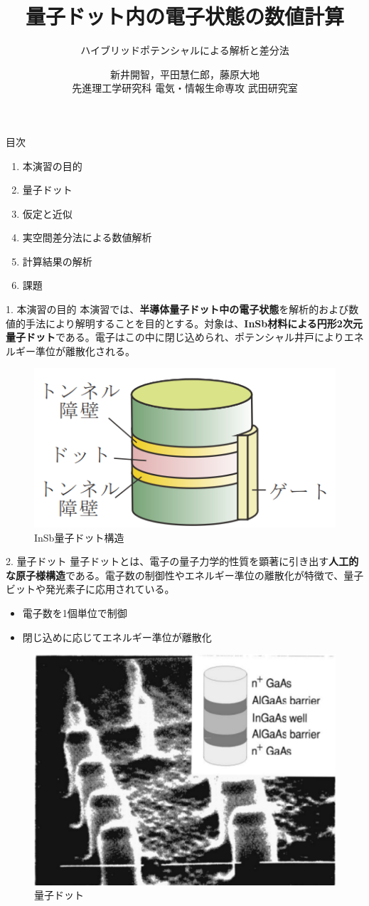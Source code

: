 \documentclass[dvipdfmx, 12pt]{beamer}
\title{量子ドット内の電子状態の数値計算}
\subtitle{ハイブリッドポテンシャルによる解析と差分法}
\author{新井開智，平田慧仁郎，藤原大地\\ \small 先進理工学研究科 電気・情報生命専攻 武田研究室}
\date{}
\begin{document}
\frame{\titlepage}

\begin{frame}{目次}
\begin{enumerate}
  \item 本演習の目的
  \item 量子ドット
  \item 仮定と近似
  \item 実空間差分法による数値解析
  \item 計算結果の解析
  \item 課題
\end{enumerate}
\end{frame}

\begin{frame}{1. 本演習の目的}
本演習では、\textbf{半導体量子ドット中の電子状態}を解析的および数値的手法により解明することを目的とする。対象は、\textbf{InSb材料による円形2次元量子ドット}である。電子はこの中に閉じ込められ、ポテンシャル井戸によりエネルギー準位が離散化される。

\begin{figure}[H]
\centering
\includegraphics[width=0.4\linewidth]{images/ドット.png}
\caption{InSb量子ドット構造}
\end{figure}
\end{frame}

\begin{frame}{2. 量子ドット}
量子ドットとは、電子の量子力学的性質を顕著に引き出す\textbf{人工的な原子様構造}である。電子数の制御性やエネルギー準位の離散化が特徴で、量子ビットや発光素子に応用されている。

\begin{itemize}
  \item 電子数を1個単位で制御
  \item 閉じ込めに応じてエネルギー準位が離散化
\end{itemize}

\begin{figure}[H]
\centering
\includegraphics[width=0.3\linewidth]{images/量子ドット.png}
\caption{量子ドット}
\end{figure}
\end{frame}

\end{document}
